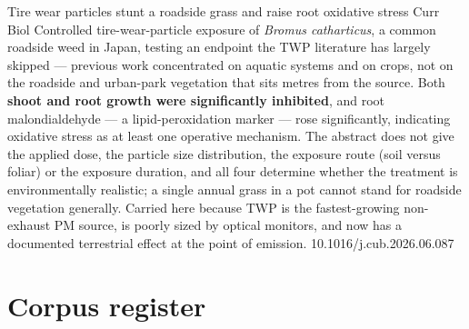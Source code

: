 \documentclass[10pt]{article}
\begin{document}
{Tire wear particles stunt a roadside grass and raise root oxidative stress}
{Curr Biol}
{Controlled tire-wear-particle exposure of \textit{Bromus catharticus}, a common roadside
weed in Japan, testing an endpoint the TWP literature has largely skipped --- previous work
concentrated on aquatic systems and on crops, not on the roadside and urban-park vegetation
that sits metres from the source. Both \textbf{shoot and root growth were significantly
inhibited}, and root malondialdehyde --- a lipid-peroxidation marker --- rose significantly,
indicating oxidative stress as at least one operative mechanism. The abstract does not give
the applied dose, the particle size distribution, the exposure route (soil versus foliar) or
the exposure duration, and all four determine whether the treatment is environmentally
realistic; a single annual grass in a pot cannot stand for roadside vegetation generally.
Carried here because TWP is the fastest-growing non-exhaust PM source, is poorly sized by
optical monitors, and now has a documented terrestrial effect at the point of emission.}
{10.1016/j.cub.2026.06.087}

\clearpage

\section*{\sffamily\bfseries\color{Deep}Corpus register}
\vspace{-1.5mm}{\color{Amber}\rule{\linewidth}{1.1pt}}\vspace{2.5mm}


\end{document}
